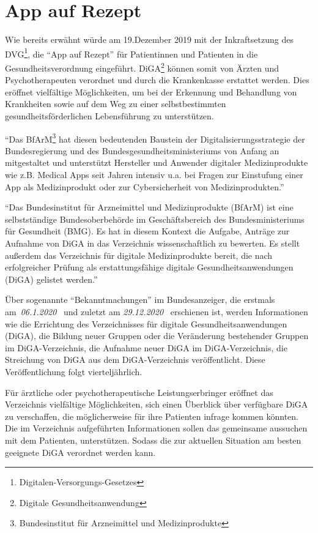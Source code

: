 \section{App auf Rezept}
Wie bereits erwähnt würde am 19.Dezember 2019 mit der Inkraftsetzung des DVG\footnote{Digitalen-Versorgungs-Gesetzes}, die ``App auf Rezept'' für Patientinnen und Patienten in die Gesundheitsverordnung eingeführt. DiGA\footnote{Digitale Gesundheitsanwendung} können somit von Ärzten und Psychotherapeuten verordnet und durch die Krankenkasse erstattet werden. Dies eröffnet vielfältige Möglichkeiten, um bei der Erkennung und Behandlung von Krankheiten sowie auf dem Weg zu einer selbstbestimmten gesundheitsförderlichen Lebensführung zu unterstützen.

``Das BfArM\footnote{Bundesinstitut für Arzneimittel und Medizinprodukte} hat diesen bedeutenden Baustein der Digitalisierungsstrategie der Bundesregierung und des Bundesgesundheitsministeriums von Anfang an mitgestaltet und unterstützt Hersteller und Anwender digitaler Medizinprodukte wie z.B. Medical Apps seit Jahren intensiv u.a. bei Fragen zur Einstufung einer App als Medizinprodukt oder zur Cybersicherheit von Medizinprodukten.''~\cite{bfarm}

``Das Bundesinstitut für Arzneimittel und Medizinprodukte (BfArM) ist eine selbstständige Bundesoberbehörde im Geschäftsbereich des Bundesministeriums für Gesundheit (BMG). Es hat in diesem Kontext die Aufgabe, Anträge zur Aufnahme von DiGA in das Verzeichnis wissenschaftlich zu bewerten. Es stellt außerdem das Verzeichnis für digitale Medizinprodukte bereit, die nach erfolgreicher Prüfung als erstattungsfähige digitale Gesundheitsanwendungen (DiGA) gelistet werden.''~\cite{bfarm}

Über sogenannte ``Bekanntmachungen'' im Bundesanzeiger, die erstmals am~\textit{06.1.2020}~\cite{bekanntmachungen061020} und zuletzt am \textit{29.12.2020}~\cite{bekanntmachungen291220} erschienen ist, werden Informationen wie die Errichtung des Verzeichnisses für digitale Gesundheitsanwendungen (DiGA), die Bildung neuer Gruppen oder die Veränderung bestehender Gruppen im DiGA-Verzeichnis, die Aufnahme neuer DiGA im DiGA-Verzeichnis, die Streichung von DiGA aus dem DiGA-Verzeichnis veröffentlicht. Diese Veröffentlichung folgt vierteljährlich.

Für ärztliche oder psychotherapeutische Leistungserbringer eröffnet das Verzeichnis vielfältige Möglichkeiten, sich einen Überblick über verfügbare DiGA zu verschaffen, die möglicherweise für ihre Patienten infrage kommen könnten. Die im Verzeichnis aufgeführten Informationen sollen das gemeinsame aussuchen mit dem Patienten, unterstützen. Sodass die zur aktuellen Situation am besten geeignete DiGA verordnet werden kann.

